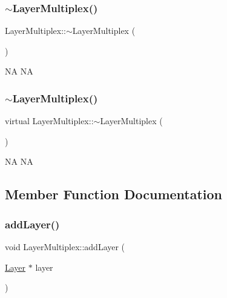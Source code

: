 \subsubsection{\texorpdfstring{$\sim$\+Layer\+Multiplex()}{~LayerMultiplex()}\hspace{0.1cm}{\footnotesize\ttfamily [1/2]}}
{\footnotesize\ttfamily Layer\+Multiplex\+::$\sim$\+Layer\+Multiplex (\begin{DoxyParamCaption}{ }\end{DoxyParamCaption})\hspace{0.3cm}{\ttfamily [virtual]}}

NA  NA \mbox{\label{classLayerMultiplex_a13aa028c7476bb88223453e5ab73c9fb}} 
\subsubsection{\texorpdfstring{$\sim$\+Layer\+Multiplex()}{~LayerMultiplex()}\hspace{0.1cm}{\footnotesize\ttfamily [2/2]}}
{\footnotesize\ttfamily virtual Layer\+Multiplex\+::$\sim$\+Layer\+Multiplex (\begin{DoxyParamCaption}{ }\end{DoxyParamCaption})\hspace{0.3cm}{\ttfamily [virtual]}}

NA  NA 

\subsection{Member Function Documentation}
\mbox{\label{classLayerMultiplex_a346cf395698a492b89e76f49cb8bc599}} 
\subsubsection{\texorpdfstring{add\+Layer()}{addLayer()}\hspace{0.1cm}{\footnotesize\ttfamily [1/2]}}
{\footnotesize\ttfamily void Layer\+Multiplex\+::add\+Layer (\begin{DoxyParamCaption}\item[{\hyperlink{classLayer}{Layer} $\ast$}]{layer }\end{DoxyParamCaption})}

